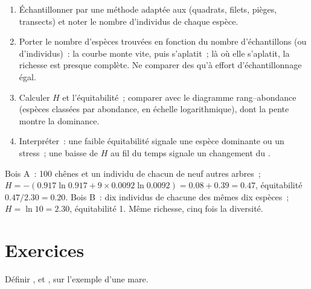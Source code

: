 \begin{method}\label{met:b1:ecosystem-organization:sampling}
\begin{enumerate}
  \item Échantillonner par une méthode adaptée aux 
        (quadrats, filets, pièges, transects) et noter le nombre
        d'individus de chaque espèce.
  \item Porter le nombre d'espèces trouvées en fonction du nombre
        d'échantillons (ou d'individus)~: la courbe monte vite, puis
        s'aplatit~; là où elle s'aplatit, la richesse est presque
        complète. Ne comparer des  qu'à effort
        d'échantillonnage égal.
  \item Calculer $H$ et l'équitabilité~; comparer avec le diagramme
        rang--abondance (espèces classées par abondance, en échelle
        logarithmique), dont la pente montre la dominance.
  \item Interpréter~: une faible équitabilité signale une espèce
        dominante ou un stress~; une baisse de $H$ au fil du temps
        signale un changement du .
\end{enumerate}
\end{method}

\begin{example}\label{ex:b1:ecosystem-organization:twowoods}
Bois A~: 100 chênes et un individu de chacun de neuf autres arbres~;
$H = -(0.917\ln
0.917 + 9\times 0.0092\ln 0.0092) = 0.08 + 0.39 = 0.47$, équitabilité
$0.47/2.30 = 0.20$. Bois B~: dix individus de chacune des mêmes dix
espèces~; $H =
\ln 10 = 2.30$, équitabilité 1. Même richesse, cinq fois la diversité.
\end{example}

\section{Exercices}

\begin{exercise}[$\star$]\label{exo:b1:ecosystem-organization:1}
Définir ,  et , sur l'exemple d'une mare.
\end{exercise}

